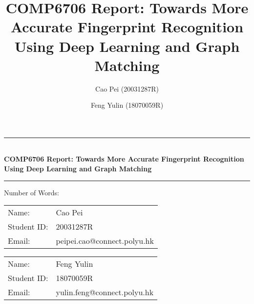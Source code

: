 \documentclass[12pt, a4paper]{article}
\title{COMP6706 Report: Towards More Accurate Fingerprint Recognition Using Deep Learning and Graph Matching}
\author{
    Cao Pei (20031287R) \\
    \text{peipei.cao@connect.polyu.hk}
    \and 
    Feng Yulin (18070059R) \\
    \text{yulin.feng@connect.polyu.hk}
}
\date{}
\newcommand{\horrule}[1]{\rule{\linewidth}{#1}}
\newcommand{\entit}{COMP6706 Report: Towards More Accurate Fingerprint Recognition Using Deep Learning and Graph Matching}
\newcommand{\numword}{Number of Words: }
\begin{document}
\begin{titlepage}
    \begin{center}
        \horrule{0.5pt} \\ [0.4cm]
        \vspace{-1.5ex}
        { \bfseries \entit \\ \vspace{0.4cm}}
          \horrule{2pt} \vspace{-2ex}
        \numword \\
    \end{center}

    \vspace{3cm}
    \begin{table}[h]
        \centering
        \begin{tabular}{p{3cm}<{\raggedleft} p{6cm}<{\centering}}
          Name:  & {Cao Pei}            \\
          Student ID:  & {20031287R}          \\
          Email:  & {peipei.cao@connect.polyu.hk} \\
        \end{tabular}
    \end{table}

    \vspace{3cm}
    \begin{table}[h]
        \centering
        \begin{tabular}{p{3cm}<{\raggedleft} p{6cm}<{\centering}}
          Name:  & {Feng Yulin}            \\
          Student ID:  & {18070059R}          \\
          Email:  & {yulin.feng@connect.polyu.hk} \\
        \end{tabular}
    \end{table}

\end{titlepage}

\newpage

\begin{spacing}{1} 

    
    
    
    
    
     
    




\end{spacing}
\end{document}
